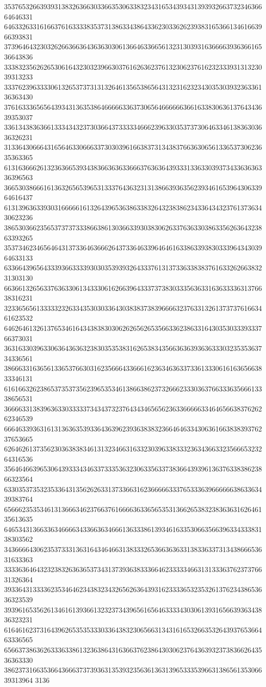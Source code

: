 35376532663939313832636630336635306338323431653439343139393266373234636664646331
64633263316166376163333835373138633438643362303362623938316536613461663966393831
37396464323032626636636436363030613664633665613231303931636666393636616536643836
33383235626265306164323032396630376162636237613230623761623233393131323039313233
33376239633330613265373731313264613565386564313231623234303530393236336136363430
37616333656564393431363538646666633637306564666666366163383063613764343639353037
33613438363661333434323730366437333334666239633035373730646334613836303636326231
31336430666431656463306663373030396166383731343837663630656133653730623635363365
61316366626132363665393438366363633666376363643933313363303937343363636336396563
36653038666161363265653965313337643632313138663936356239346165396430633964616437
61313963633930316666616132643965363863383264323838623433643432376137363430623236
38653036623565373737333866386130366339303830626337636330386335626364323863393265
35373462346564643137336463666264373364633964646163386339383033396434303964633133
63366439656433393663333930303539393264333761313733633838376163326266383231303130
66366132656337636330613433306162663964333737383033356363316363333631376638316231
32336565613333323263343530303364303838373839666632376331326137373761663461623532
64626461326137653461643438383030626265626535663362386331643035303339333766373031
36316330396330636436363238303535383162653834356636363936363330323535363734336561
38666331636561336537663031623566643366616236346363373361333061616365663833346131
61616632623865373537356239653534613866386237326662333036376633363566613338656531
36666331383963633033333734343732376434346565623633666663346465663837626262346539
66646339363161313636353933643639623936383832366464633430636166383839376237653665
62646261373562303638383461313234663163323039633833323634366332356665323264316536
35646466396530643933343463373335363230633563373836643939613637633838623866323564
63303537353235336431356262633137336631623666663337653336396666663863363439383764
65666235353461313666346237663761666636336565353136626538323836363162646135613635
64653431366336346666343366363466613633386139346163353066356639633433383138303562
34366664306235373331363164346466313833326536636363313833633731343866653631633363
33336364643232383263636537343137393638333664623333346631313336376237376631326364
39336431333362353464623438323432656263643931623333653235326137623438653636323539
39396165356261346161393661323237343965616564633334303061393165663936343836323231
61646162373164396265353533303364383230656631343161653266353264393765366463336565
65663738636263336338613236386431636637623864303062376436393237383662643536363330
38623731663536643666373739363135393235636136313965333539663138656135306639313964
3136
